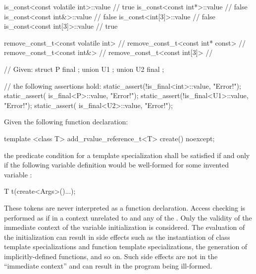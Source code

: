 
\pnum
\enterexample
\begin{codeblock}
is_const<const volatile int>::value     // true
is_const<const int*>::value             // false
is_const<const int&>::value             // false
is_const<int[3]>::value                 // false
is_const<const int[3]>::value           // true
\end{codeblock}
\exitexample

\pnum
\enterexample
\begin{codeblock}
remove_const_t<const volatile int>  // 
remove_const_t<const int* const>    // 
remove_const_t<const int&>          // 
remove_const_t<const int[3]>        // 
\end{codeblock}
\exitexample

\pnum
\enterexample
\begin{codeblock}
// Given:
struct P final { };
union U1 { };
union U2 final { };

// the following assertions hold:
static_assert(!is_final<int>::value, "Error!");
static_assert( is_final<P>::value, "Error!");
static_assert(!is_final<U1>::value, "Error!");
static_assert( is_final<U2>::value, "Error!");
\end{codeblock}
\exitexample

\pnum
Given the following function declaration:
\begin{codeblock}
template <class T>
  add_rvalue_reference_t<T> create() noexcept;
\end{codeblock}

the predicate condition for a template specialization
 shall be satisfied if and only if the
following variable definition would be well-formed for some invented variable :

\begin{codeblock}
T t(create<Args>()...);
\end{codeblock}

\enternote These tokens are never interpreted as a function declaration.
\exitnote Access checking is performed as if in a context unrelated to 
and any of the . Only the validity of the immediate context of the
variable initialization is considered. \enternote The evaluation of the
initialization can result in side effects such as the instantiation of class
template specializations and function template specializations, the generation
of implicitly-defined functions, and so on. Such side effects are not in the
``immediate context'' and can result in the program being ill-formed. \exitnote

